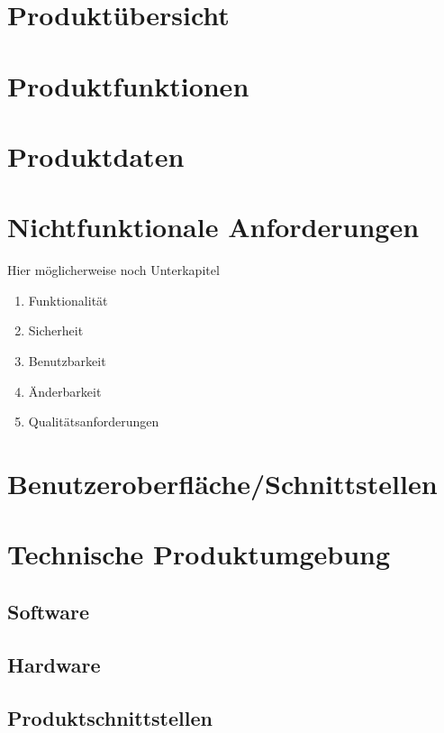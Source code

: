 \documentclass[parskip=full]{scrartcl} %
\begin{document}
\newpage



\section{Produktübersicht}
\newpage



\section{Produktfunktionen}
\newpage



\section{Produktdaten}
\newpage



\section{Nichtfunktionale Anforderungen}
Hier möglicherweise noch Unterkapitel
\begin{enumerate}
    \item Funktionalität
    \item Sicherheit
    \item Benutzbarkeit
    \item Änderbarkeit
    \item Qualitätsanforderungen
\end{enumerate}
\newpage



\section{Benutzeroberfläche/Schnittstellen}
\newpage



\section{Technische Produktumgebung}

\subsection{Software}
\subsection{Hardware}
\subsection{Produktschnittstellen}
\newpage
\end{document}
